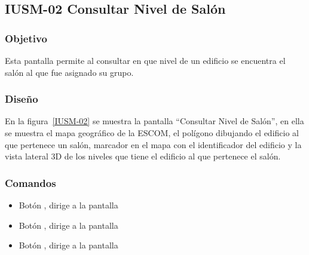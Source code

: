 \subsection{IUSM-02  Consultar Nivel de Salón}

\subsubsection{Objetivo}

	
    Esta pantalla permite al  consultar en que nivel de un edificio se encuentra el salón al que fue asignado su grupo.
\subsubsection{Diseño}


    En la figura~\ref{IUSM-02} se muestra la pantalla ``Consultar Nivel de Salón'', en ella se muestra el mapa geográfico de la ESCOM, el polígono dibujando el edificio al que pertenece un salón, marcador en el mapa con el identificador del edificio y la vista lateral 3D de los niveles que tiene el edificio al que pertenece el salón.



\subsubsection{Comandos}
    \begin{itemize}

	\item Botón \botInformacion, dirige a la pantalla 
	\item Botón , dirige a la pantalla 
	\item Botón , dirige a la pantalla  
    \end{itemize}
